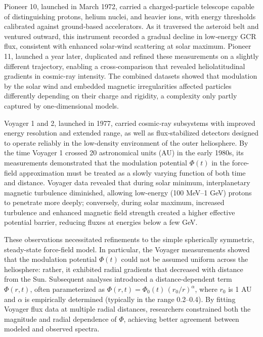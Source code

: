 \documentclass[12pt]{report}
\begin{document}
Pioneer 10, launched in March 1972, carried a charged‐particle telescope capable of distinguishing protons, helium nuclei, and heavier ions, with energy thresholds calibrated against ground‐based accelerators. As it traversed the asteroid belt and ventured outward, this instrument recorded a gradual decline in low‐energy GCR flux, consistent with enhanced solar‐wind scattering at solar maximum. Pioneer 11, launched a year later, duplicated and refined these measurements on a slightly different trajectory, enabling a cross‐comparison that revealed heliolatitudinal gradients in cosmic-ray intensity. The combined datasets showed that modulation by the solar wind and embedded magnetic irregularities affected particles differently depending on their charge and rigidity, a complexity only partly captured by one‐dimensional models.

Voyager 1 and 2, launched in 1977, carried cosmic‐ray subsystems with improved energy resolution and extended range, as well as flux‐stabilized detectors designed to operate reliably in the low‐density environment of the outer heliosphere. By the time Voyager 1 crossed 20 astronomical units (AU) in the early 1980s, its measurements demonstrated that the modulation potential \(\Phi(t)\) in the force-field approximation must be treated as a slowly varying function of both time and distance. Voyager data revealed that during solar minimum, interplanetary magnetic turbulence diminished, allowing low-energy (100 MeV–1 GeV) protons to penetrate more deeply; conversely, during solar maximum, increased turbulence and enhanced magnetic field strength created a higher effective potential barrier, reducing fluxes at energies below a few GeV.

These observations necessitated refinements to the simple spherically symmetric, steady-state force-field model. In particular, the Voyager measurements showed that the modulation potential \(\Phi(t)\) could not be assumed uniform across the heliosphere: rather, it exhibited radial gradients that decreased with distance from the Sun. Subsequent analyses introduced a distance-dependent term \(\Phi(r,t)\), often parameterized as \(\Phi(r,t) = \Phi_0(t)\,(r_0 / r)^\alpha\), where \(r_0\) is 1 AU and \(\alpha\) is empirically determined (typically in the range 0.2–0.4). By fitting Voyager flux data at multiple radial distances, researchers constrained both the magnitude and radial dependence of \(\Phi\), achieving better agreement between modeled and observed spectra.
\end{document}
